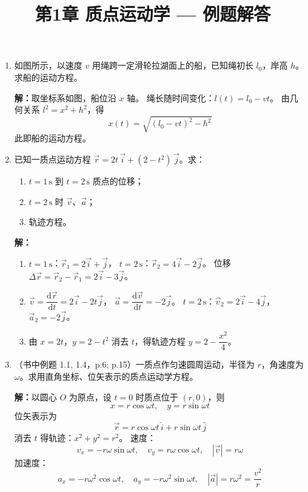 \documentclass{ctexart}
\title{\textbf{第1章 质点运动学} --- 例题解答}
\author{}
\date{}
\begin{document}
\maketitle

\begin{enumerate}

\item 如图所示，以速度 $v$ 用绳跨一定滑轮拉湖面上的船，已知绳初长 $l_0$，岸高 $h$。求船的运动方程。

\textbf{解：}取坐标系如图，船位沿 $x$ 轴。
绳长随时间变化：$l(t) = l_0 - vt$。
由几何关系 $l^{2} = x^{2} + h^{2}$，得
\[
x(t) = \sqrt{(l_0 - vt)^{2} - h^{2}}
\]
此即船的运动方程。

\item 已知一质点运动方程 $\vec{r} = 2t\,\vec{i} + (2 - t^{2})\,\vec{j}$。求：
\begin{enumerate}
  \item $t = 1\,\text{s}$ 到 $t = 2\,\text{s}$ 质点的位移；
  \item $t = 2\,\text{s}$ 时 $\vec{v}$、$\vec{a}$；
  \item 轨迹方程。
\end{enumerate}

\textbf{解：}
\begin{enumerate}
  \item $t = 1\,\text{s}$：$\vec{r}_1 = 2\vec{i} + \vec{j}$，
    $t = 2\,\text{s}$：$\vec{r}_2 = 4\vec{i} - 2\vec{j}$。
    位移 $\Delta\vec{r} = \vec{r}_2 - \vec{r}_1 = 2\vec{i} - 3\vec{j}$。
  \item $\vec{v} = \dfrac{\mathrm{d}\vec{r}}{\mathrm{d}t} = 2\vec{i} - 2t\vec{j}$，
    $\vec{a} = \dfrac{\mathrm{d}\vec{v}}{\mathrm{d}t} = -2\vec{j}$。
    $t = 2\,\text{s}$：$\vec{v}_2 = 2\vec{i} - 4\vec{j}$，$\vec{a}_2 = -2\vec{j}$。
  \item 由 $x = 2t$，$y = 2 - t^{2}$ 消去 $t$，得轨迹方程 $y = 2 - \dfrac{x^{2}}{4}$。
\end{enumerate}

\item（书中例题 1.1, 1.4，p.6; p.15）一质点作匀速圆周运动，半径为 $r$，角速度为 $\omega$。求用直角坐标、位矢表示的质点运动学方程。

\textbf{解：}以圆心 $O$ 为原点，设 $t = 0$ 时质点位于 $(r, 0)$，则
\[
x = r\cos\omega t,\quad y = r\sin\omega t
\]
位矢表示为
\[
\vec{r} = r\cos\omega t\,\hat{i} + r\sin\omega t\,\hat{j}
\]
消去 $t$ 得轨迹：$x^{2} + y^{2} = r^{2}$。
速度：
\[
v_x = -r\omega\sin\omega t,\quad v_y = r\omega\cos\omega t,\quad |\vec{v}| = r\omega
\]
加速度：
\[
a_x = -r\omega^{2}\cos\omega t,\quad a_y = -r\omega^{2}\sin\omega t,\quad |\vec{a}| = r\omega^{2} = \frac{v^{2}}{r}
\]


\end{enumerate}
\end{document}
